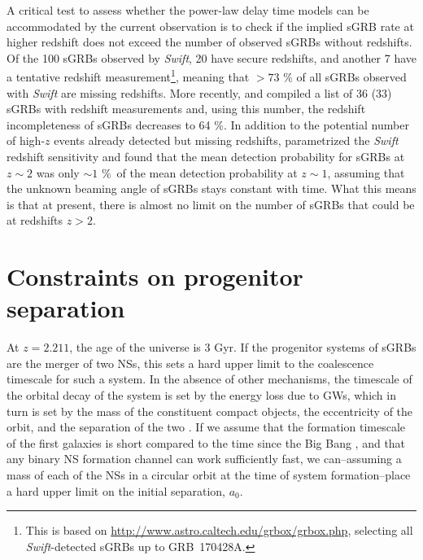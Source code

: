 \documentclass[longauth]{aa}    %
\begin{document}
A critical test to assess whether the power-law delay  time models can be accommodated
by the current observation is to check if the implied sGRB rate at higher
redshift does not exceed the number of observed sGRBs without redshifts. Of the
100  sGRBs observed by \textit{Swift}, 20 have secure redshifts, and another 7
have a tentative redshift measurement\footnote{This is based on
        \url{http://www.astro.caltech.edu/grbox/grbox.php}, selecting all 
        \textit{Swift}-detected sGRBs up to GRB~170428A.}, meaning that $> 73$ \%
of all sGRBs observed with \textit{Swift} are missing redshifts. More recently,
\citet{Fong2017} and \citet{LIGOScientificCollaboration2017b} compiled a list of 36
(33) sGRBs with redshift measurements and, using this number, the redshift
incompleteness of sGRBs decreases to 64 \%. In addition to the potential
number of high-$z$ events already detected but missing redshifts,
\citet{Behroozi2014} parametrized the \textit{Swift} redshift sensitivity and
found that the mean detection probability for sGRBs at $z \sim2$ was only
$\sim1$ \%\ of the mean detection probability at $z \sim1$, assuming that
the unknown beaming angle of sGRBs stays constant with time. What this means is
that at  present, there is almost no limit on the number of sGRBs that could
be at redshifts $z > 2$.

\section{Constraints on progenitor separation}

At $z = 2.211$, the age of the universe is 3 Gyr. If the progenitor systems of
sGRBs are the merger of two NSs, this sets a hard upper limit to the coalescence
timescale for such a system. In the absence of other mechanisms, the timescale
of the orbital decay of the system is set by the energy loss due to
GWs, which in turn is set by the mass of the constituent compact
objects, the eccentricity of the orbit, and the separation of the two
\citep{Postnov2014}. If we assume that the formation timescale of the first
galaxies is short compared to the time since the Big Bang \citep{Richard2011},
and that any binary NS formation channel can work sufficiently fast,
we can--assuming a mass of each of the NSs in a circular orbit at the time of
system formation--place a hard upper limit on the initial separation, $a_0$.
\end{document}
